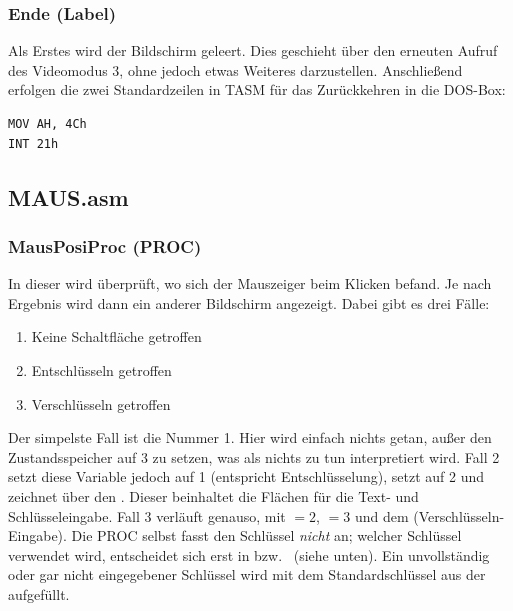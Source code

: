 \subsubsection{Ende (Label)}
Als Erstes wird der Bildschirm geleert. Dies geschieht über den erneuten Aufruf des Videomodus 3, ohne jedoch etwas Weiteres darzustellen. Anschließend erfolgen die zwei Standardzeilen in TASM für das Zurückkehren in die DOS-Box:

\begin{lstlisting}[language=TASM]
MOV AH, 4Ch
INT 21h
\end{lstlisting}

\subsection{MAUS.asm}
\subsubsection{MausPosiProc (PROC)}\label{sec:mausposiproc}
In dieser  wird überprüft, wo sich der Mauszeiger beim Klicken befand. Je nach Ergebnis wird dann ein anderer Bildschirm angezeigt. Dabei gibt es drei Fälle:

\begin{enumerate}[label=\arabic*,noitemsep]
    \item Keine Schaltfläche getroffen
    \item Entschlüsseln getroffen
    \item Verschlüsseln getroffen
\end{enumerate}

Der simpelste Fall ist die Nummer 1. Hier wird einfach nichts getan, außer den Zustandsspeicher  auf 3 zu setzen, was als \glqq nichts zu tun\grqq{} interpretiert wird. Fall 2 setzt diese Variable jedoch auf 1 (entspricht Entschlüsselung), setzt  auf 2 und zeichnet über  den . Dieser beinhaltet die Flächen für die Text- und Schlüsseleingabe. Fall 3 verläuft genauso, mit  $=2$,  $=3$ und dem  (Verschlüsseln-Eingabe). Die PROC selbst fasst den Schlüssel \emph{nicht} an; welcher Schlüssel verwendet wird, entscheidet sich erst in  bzw.\  (siehe unten). Ein unvollständig oder gar nicht eingegebener Schlüssel wird mit dem Standardschlüssel aus der  aufgefüllt.

